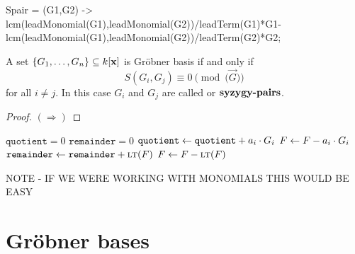 \documentclass{ximera}
\begin{document}
\begin{macaulay2}
Spair = (G1,G2) ->
lcm(leadMonomial(G1),leadMonomial(G2))/leadTerm(G1)*G1-
lcm(leadMonomial(G1),leadMonomial(G2))/leadTerm(G2)*G2;
\end{macaulay2}





\begin{theorem}
  A set $\{G_1,\dots,G_n\}\subseteq k[\mathbf{x}]$ is Gr\"obner basis if and
  only if
  \[
  S(G_i,G_j) \equiv 0 \pmod{(\vec{G}})
  \]
  for all $i\ne j$. In this case $G_i$ and $G_j$ are called
   or $\dfn{syzygy-pairs}$.
  \begin{proof}
    $(\Rightarrow)$
  \end{proof}
\end{theorem}




\begin{algorithm}
  \hfill
  \begin{algorithmic}[1]
    \State $\texttt{quotient} = 0$
    \State $\texttt{remainder} = 0$
    \Repeat
    \State $\texttt{quotient} \leftarrow \texttt{quotient} + a_i\cdot G_i$
    \State $F \leftarrow F - a_i\cdot G_i$
    \Else
    \State $\texttt{remainder} \leftarrow \texttt{remainder} + \textsc{lt}(F)$
    \State $F\leftarrow F- \textsc{lt}(F)$
    \EndIf
  \end{algorithmic}
\end{algorithm}


NOTE - IF WE WERE WORKING WITH MONOMIALS THIS WOULD BE EASY



\section{Gr\"obner bases}
\end{document}
